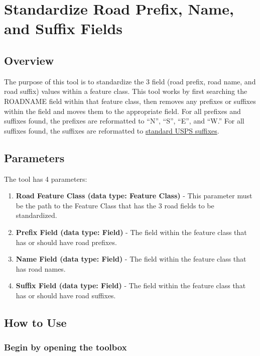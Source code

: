 \documentclass[openany]{book}
\providecommand{\tightlist}{%
  \setlength{\itemsep}{0pt}\setlength{\parskip}{0pt}}
\theoremstyle{definition}
\theoremstyle{definition}
\theoremstyle{definition}
\theoremstyle{remark}
\begin{document}
\hypertarget{std3}{\chapter{Standardize Road Prefix, Name, and Suffix
Fields}\label{std3}}

\section{Overview}\label{overview-8}

The purpose of this tool is to standardize the 3 field (road prefix,
road name, and road suffix) values within a feature class. This tool
works by first searching the ROADNAME field within that feature class,
then removes any prefixes or suffixes within the field and moves them to
the appropriate field. For all prefixes and suffixes found, the prefixes
are reformatted to ``N'', ``S'', ``E'', and ``W.'' For all suffixes
found, the suffixes are reformatted to
\href{https://github.com/allanbreyes/udacity-data-science/blob/master/p2/data/suffixes.csv}{standard
USPS suffixes}.

\section{Parameters}\label{parameters-8}

The tool has 4 parameters:

\begin{enumerate}
\def\labelenumi{\arabic{enumi}.}
\tightlist
\item
  \textbf{Road Feature Class (data type: Feature Class)} - This
  parameter must be the path to the Feature Class that has the 3 road
  fields to be standardized.
\item
  \textbf{Prefix Field (data type: Field)} - The field within the
  feature class that has or should have road prefixes.
\item
  \textbf{Name Field (data type: Field)} - The field within the feature
  class that has road names.
\item
  \textbf{Suffix Field (data type: Field)} - The field within the
  feature class that has or should have road suffixes.
\end{enumerate}

\section{How to Use}\label{how-to-use-8}

\subsection{Begin by opening the
toolbox}\label{begin-by-opening-the-toolbox-8}
\end{document}
